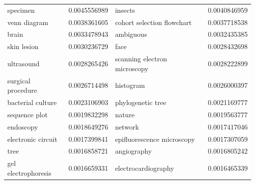 \documentclass[11pt]{article}
\begin{document}
\begin{table}[htbp]
{\begin{tabular}{ll|ll}
specimen & 0.0045556989 & insects & 0.0040846959 \\
venn diagram & 0.0038361605 & cohort selection flowchart & 0.0037718538 \\
brain & 0.0033478943 & ambiguous & 0.0032435385 \\
skin lesion & 0.0030236729 & face & 0.0028432698 \\
ultrasound & 0.0028265426 & scanning electron microscopy & 0.0028222899 \\
surgical procedure & 0.0026714498 & histogram & 0.0026000397 \\
bacterial culture & 0.0023106903 & phylogenetic tree & 0.0021169777 \\
sequence plot & 0.0019832298 & nature & 0.0019563777 \\
endoscopy & 0.0018649276 & network & 0.0017417046 \\
electronic circuit & 0.0017399841 & epifluorescence microscopy & 0.0017307059 \\
tree & 0.0016858721 & angiography & 0.0016805242 \\
gel electrophoresis & 0.0016659331 & electrocardiography & 0.0016465339 \\
\hline
\end{tabular}
}
\end{table}
\end{document}
